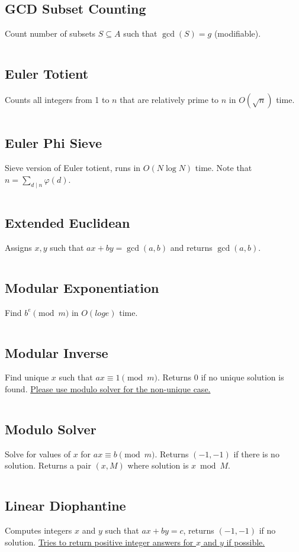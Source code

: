 \documentclass[8pt,a4paper,landscape,oneside]{amsart}
\newcommand{\code}[1]{\inputminted[fontsize=\normalsize,baselinestretch=1]{cpp}{_code/#1}}
\begin{document}
\begin{multicols*}{3}
  \subsection{GCD Subset Counting}
    Count number of subsets $S \subseteq A$ such that $\gcd(S) = g$ (modifiable).
    \code{numtheory/gcd-subsets.cpp}
  \subsection{Euler Totient}
    Counts all integers from 1 to $n$ that are relatively prime to $n$ in $O(\sqrt{n})$ time.
    \code{numtheory/totient.cpp}
  \subsection{Euler Phi Sieve}
    Sieve version of Euler totient, runs in $O(N \log N)$ time. Note that $n = \sum_{d\mid n} \varphi(d)$.
    \code{numtheory/phi-sieve.cpp}
  \subsection{Extended Euclidean}
    Assigns $x,y$ such that $ax + by = \gcd(a,b)$ and returns $\gcd(a,b)$.
    \code{numtheory/extended-euclidean.cpp}
  \subsection{Modular Exponentiation}
    Find $b^e \pmod m$ in $O(log e)$ time.
    \code{numtheory/mod_pow.cpp}
  \subsection{Modular Inverse}
    Find unique $x$ such that $ax \equiv 1 \pmod m$. Returns 0 if no unique solution is found. \underline{Please use modulo solver for the non-unique case.}
    \code{numtheory/modinv.cpp}
  \subsection{Modulo Solver}
    Solve for values of $x$ for $ax \equiv b \pmod m$. Returns $(-1,-1)$ if there is no solution. Returns a pair $(x, M)$ where solution is $x \bmod M$.
    \code{numtheory/modsolver.cpp}
  \subsection{Linear Diophantine}
    Computes integers $x$ and $y$ such that $ax+by=c$, returns $(-1,-1)$ if no solution. \underline{Tries to return positive integer answers for $x$ and $y$ if possible.}
    \code{numtheory/linear-diophantine.cpp}

\end{multicols*}
\end{document}
